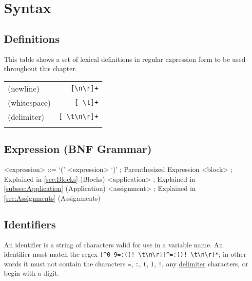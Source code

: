\documentclass[letterpaper,titlepage]{scrreprt}
\begin{document}
\chapter{Syntax}
\label{ch:Syntax}

\section{Definitions}
\label{sec:Definitions}

This table shows a set of lexical definitions in regular expression form to be used throughout this chapter.

\begin{tabular}{l r}

(newline) & \lstinline|[\n\r]+| \\
\label{def:newline}
(whitespace) & \lstinline|[ \t]+| \\
\label{def:whitespace}
(delimiter) & \lstinline|[ \t\n\r]+| \\
\label{def:delimiter}

\end{tabular}

\section{Expression (BNF Grammar)}
\label{sec:Expression}

\begin{grammar}

<expression> ::= `(' <expression> `)' ; Parenthesized Expression
\alt <block> ; Explained in \hyperref[sec:Blocks]{\ref{sec:Blocks}} (Blocks)
\alt <application> ; Explained in \hyperref[subsec:Application]{\ref{subsec:Application}} (Application)
\alt <assignment> ; Explained in \hyperref[sec:Assignments]{\ref{sec:Assignments}} (Assignments)

\end{grammar}

\section{Identifiers}
\label{sec:Identifiers}

An identifier is a string of characters valid for use in a variable name. An identifier must match the regex \lstinline{[^0-9=:()! \t\n\r][^=:()! \t\n\r]*}; in other words it must not contain the characters \lstinline{=}, \lstinline{:}, \lstinline{(}, \lstinline{)}, \lstinline{!}, any \hyperref[def:delimiter]{delimiter} characters, or begin with a digit.
\end{document}
